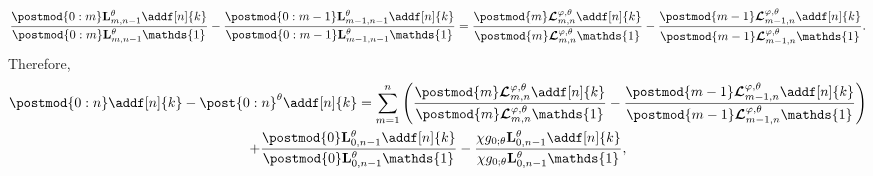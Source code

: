 \documentclass{article}
\newcommand{\precpar}{\varphi}
\newcommand{\1}{\mathbbm{1}}
\newcommand{\retrokmod}{\boldsymbol{\mathcal{L}}^{\precpar,\theta}}
\newcommand{\uk}[1]{\mathbf{L}_{#1}}
\newcommand{\md}[1]{g_{#1}}
\newcommand{\parvec}{\theta}
\def\1{\mathds{1}}
\begin{document}
$$
\frac{\postmod{0:m} \uk{m, n - 1}^\theta \addf[n]{k}}{\postmod{0:m} \uk{m, n - 1}^\theta \1_{}} - \frac{\postmod{0:m - 1} \uk{m - 1, n - 1}^\theta \addf[n]{k}}{\postmod{0:m - 1} \uk{m - 1, n - 1}^\theta \1_{}} 
= \frac{\postmod{m} \retrokmod_{m, n} \addf[n]{k}}{\postmod{m} \retrokmod_{m, n} \1_{}} - \frac{\postmod{m - 1} \retrokmod_{m - 1, n} \addf[n]{k}}{\postmod{m - 1} \retrokmod_{m - 1, n} \1_{}}. 
$$
Therefore,
\begin{multline}
\label{eq:error:decomp}
\postmod{0:n} \addf[n]{k} - \post{0:n}^\theta \addf[n]{k} = 
\sum_{m = 1}^n \left( \frac{\postmod{m} \retrokmod_{m, n} \addf[n]{k}}{\postmod{m} \retrokmod_{m, n} \1_{}} - \frac{\postmod{m - 1} \retrokmod_{m - 1, n} \addf[n]{k}}{\postmod{m - 1} \retrokmod_{m - 1, n} \1_{}} \right) \\ + \frac{\postmod{0} \uk{0, n - 1}^\theta \addf[n]{k}}{\postmod{0} \uk{0, n - 1}^\theta \1_{}} - \frac{\chi \md{0;\parvec}\uk{0, n - 1}^\theta \addf[n]{k}}{\chi\md{0;\parvec}\uk{0, n - 1}^\theta \1_{}},
\end{multline}
\end{document}

